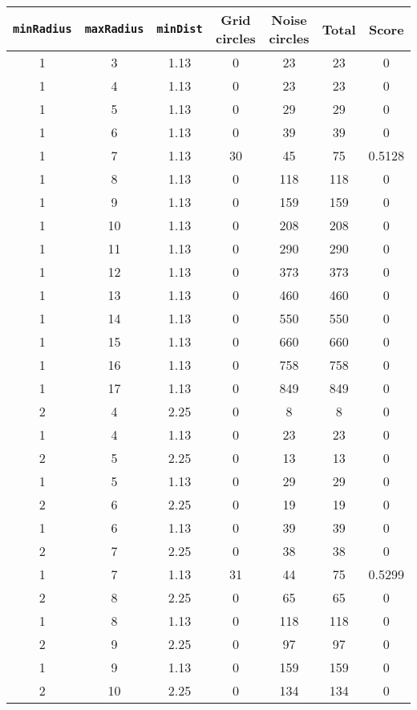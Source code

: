 \documentclass[letterpaper, 12pt]{article}
\begin{document}
\begin{longtable}{|c|c|c|c|c|c|c|}
\hline
\textbf{\texttt{minRadius}} & \textbf{\texttt{maxRadius}} & \textbf{\texttt{minDist}} & \textbf{Grid circles} & \textbf{Noise circles} & \textbf{Total} & \textbf{Score} \\
\hline
1 & 3 & 1.13 & 0 & 23 & 23 & 0 \\
\hline
1 & 4 & 1.13 & 0 & 23 & 23 & 0 \\
\hline
1 & 5 & 1.13 & 0 & 29 & 29 & 0 \\
\hline
1 & 6 & 1.13 & 0 & 39 & 39 & 0 \\
\hline
1 & 7 & 1.13 & 30 & 45 & 75 & 0.5128 \\
\hline
1 & 8 & 1.13 & 0 & 118 & 118 & 0 \\
\hline
1 & 9 & 1.13 & 0 & 159 & 159 & 0 \\
\hline
1 & 10 & 1.13 & 0 & 208 & 208 & 0 \\
\hline
1 & 11 & 1.13 & 0 & 290 & 290 & 0 \\
\hline
1 & 12 & 1.13 & 0 & 373 & 373 & 0 \\
\hline
1 & 13 & 1.13 & 0 & 460 & 460 & 0 \\
\hline
1 & 14 & 1.13 & 0 & 550 & 550 & 0 \\
\hline
1 & 15 & 1.13 & 0 & 660 & 660 & 0 \\
\hline
1 & 16 & 1.13 & 0 & 758 & 758 & 0 \\
\hline
1 & 17 & 1.13 & 0 & 849 & 849 & 0 \\
\hline
2 & 4 & 2.25 & 0 & 8 & 8 & 0 \\
\hline
1 & 4 & 1.13 & 0 & 23 & 23 & 0 \\
\hline
2 & 5 & 2.25 & 0 & 13 & 13 & 0 \\
\hline
1 & 5 & 1.13 & 0 & 29 & 29 & 0 \\
\hline
2 & 6 & 2.25 & 0 & 19 & 19 & 0 \\
\hline
1 & 6 & 1.13 & 0 & 39 & 39 & 0 \\
\hline
2 & 7 & 2.25 & 0 & 38 & 38 & 0 \\
\hline
1 & 7 & 1.13 & 31 & 44 & 75 & 0.5299 \\
\hline
2 & 8 & 2.25 & 0 & 65 & 65 & 0 \\
\hline
1 & 8 & 1.13 & 0 & 118 & 118 & 0 \\
\hline
2 & 9 & 2.25 & 0 & 97 & 97 & 0 \\
\hline
1 & 9 & 1.13 & 0 & 159 & 159 & 0 \\
\hline
2 & 10 & 2.25 & 0 & 134 & 134 & 0 \\

\end{longtable}
\end{document}
